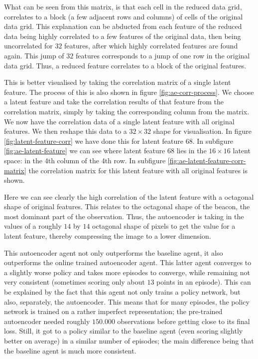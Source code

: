 What can be seen from this matrix, is that each cell in the reduced data grid, correlates to a block (a few adjacent rows and columns) of cells of the original data grid. This explanation can be abducted from each feature of the reduced data being highly correlated to a few features of the original data, then being uncorrelated for $32$ features, after which highly correlated features are found again. This jump of $32$ features corresponds to a jump of one row in the original data grid. Thus, a reduced feature correlates to a block of the original features.

This is better visualised by taking the correlation matrix of a single latent feature. The process of this is also shown in figure \ref{fig:ae-corr-process}. We choose a latent feature and take the correlation results of that feature from the correlation matrix, simply by taking the corresponding column from the matrix. We now have the correlation data of a single latent feature with all original features. We then reshape this data to a $32 \times 32$ shape for visualisation. In figure \ref{fig:latent-feature-corr} we have done this for latent feature $68$. In subfigure \ref{fig:ae-latent-feature} we can see where latent feature $68$ lies in the $16 \times 16$ latent space: in the 4th column of the 4th row. In subfigure \ref{fig:ae-latent-feature-corr-matrix} the correlation matrix for this latent feature with all original features is shown.

Here we can see clearly the high correlation of the latent feature with a octagonal shape of original features. This relates to the octagonal shape of the beacon, the most dominant part of the observation. Thus, the autoencoder is taking in the values of a roughly $14$ by $14$ octagonal shape of pixels to get the value for a latent feature, thereby compressing the image to a lower dimension.

This autoencoder agent not only outperforms the baseline agent, it also outperforms the online trained autoencoder agent. This latter agent converges to a slightly worse policy and takes more episodes to converge, while remaining not very consistent (sometimes scoring only about $13$ points in an episode). This can be explained by the fact that this agent not only trains a policy network, but also, separately, the autoencoder. This means that for many episodes, the policy network is trained on a rather imperfect representation; the pre-trained autoencoder needed roughly $150.000$ observations before getting close to its final loss. Still, it got to a policy similar to the baseline agent (even scoring slightly better on average) in a similar number of episodes; the main difference being that the baseline agent is much more consistent.

